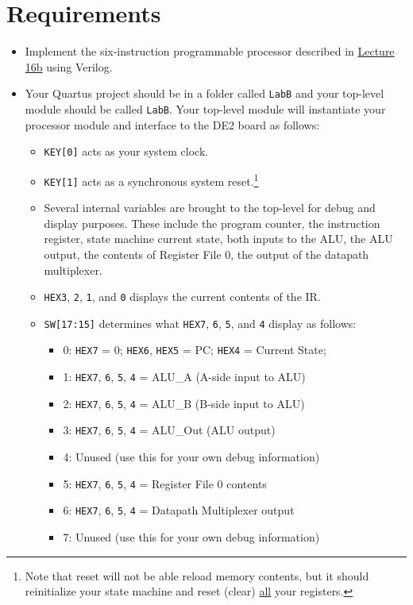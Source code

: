 \section{Requirements} \label{sec:requirements}

\begin{itemize}
    \item Implement the six-instruction programmable processor described in
    \href{https://moodle.insttech.washington.edu/mod/resource/view.php?id=32929}{Lecture 16b} using Verilog.
    \item Your Quartus project should be in a folder called \verb|LabB| and your top-level module should be called \verb|LabB|.
    Your top-level module will instantiate your processor module and interface to the DE2 board as follows:
    \begin{itemize}
        \item \verb|KEY[0]| acts as your system clock.
        \item \verb|KEY[1]| acts as a synchronous system reset.\footnote{%
            Note that reset will not be able reload memory contents,
            but it should reinitialize your state machine and reset (clear) \underline{all} your registers.
        }
        \item Several internal variables are brought to the top-level for debug and display purposes.
        These include the program counter, the instruction register, state machine current state,
        both inputs to the ALU, the ALU output, the contents of Register File 0, the output of the datapath multiplexer.
        \item \verb|HEX3|, \verb|2|, \verb|1|, and \verb|0| displays the current contents of the IR.
        \item \verb|SW[17:15]| determines what \verb|HEX7|, \verb|6|, \verb|5|, and \verb|4| display as follows:
        \begin{itemize}
            \item 0: \verb|HEX7| = 0; \verb|HEX6|, \verb|HEX5| = PC; \verb|HEX4| = Current State;
            \item 1: \verb|HEX7|, \verb|6|, \verb|5|, \verb|4| = ALU\_A (A-side input to ALU)
            \item 2: \verb|HEX7|, \verb|6|, \verb|5|, \verb|4| = ALU\_B (B-side input to ALU)
            \item 3: \verb|HEX7|, \verb|6|, \verb|5|, \verb|4| = ALU\_Out (ALU output)
            \item 4: Unused (use this for your own debug information)
            \item 5: \verb|HEX7|, \verb|6|, \verb|5|, \verb|4| = Register File 0 contents
            \item 6: \verb|HEX7|, \verb|6|, \verb|5|, \verb|4| = Datapath Multiplexer output
            \item 7: Unused (use this for your own debug information)
        \end{itemize}
    \end{itemize}


\end{itemize}

